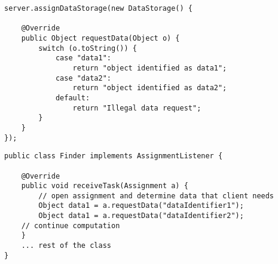 \documentclass[a4paper,12pt]{article}
\begin{document}
\begin{lstlisting}[style=javaPseudo, title=Code for the server part]
server.assignDataStorage(new DataStorage() {

	@Override
	public Object requestData(Object o) {
		switch (o.toString()) {
			case "data1":
				return "object identified as data1";                        
			case "data2":
				return "object identified as data2";
			default:
				return "Illegal data request";
		}
	}
});
\end{lstlisting}
\begin{lstlisting}[style=javaPseudo, title=Code for the client part]
public class Finder implements AssignmentListener {

	@Override
    public void receiveTask(Assignment a) {
    	// open assignment and determine data that client needs    	
    	Object data1 = a.requestData("dataIdentifier1");
    	Object data1 = a.requestData("dataIdentifier2");
	// continue computation
    }
	... rest of the class
}
\end{lstlisting}
\end{document}
